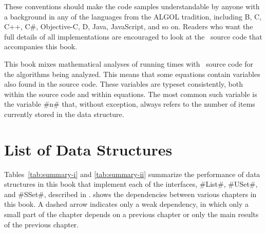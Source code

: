These conventions should make the code samples understandable by
anyone with a background in any of the languages from the ALGOL tradition,
including B, C, C++, C\#, Objective-C, D, Java, JavaScript, and so on.
Readers who want the full details of all implementations are encouraged
to look at the \lang\ source code that accompanies this book.

This book mixes mathematical analyses of running times with \lang\
source code for the algorithms being analyzed.  This means that
some equations contain variables also found in the source code.
These variables are typeset consistently, both within the source code
and within equations.  The most common such variable is the variable #n#
\index{n@#n#}%
that, without exception, always refers to the number of items currently
stored in the data structure.

\section{List of Data Structures}

Tables~\ref{tab:summary-i} and \ref{tab:summary-ii} summarize the
performance of data structures in this book that implement each of the
interfaces, #List#, #USet#, and #SSet#, described in .
\Figref{dependencies} shows the dependencies between various chapters in
this book.
%
A dashed arrow indicates only a weak dependency, in which
only a small part of the chapter depends on a previous chapter or only
the main results of the previous chapter.

